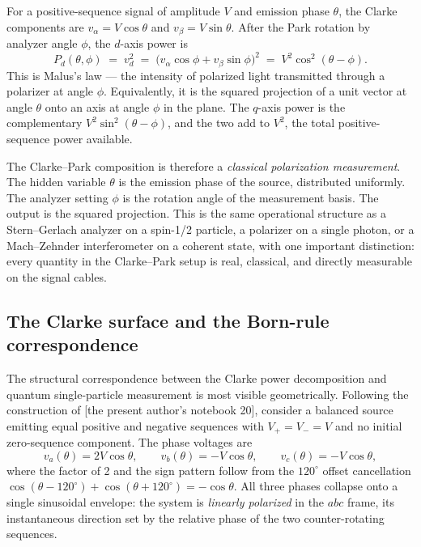 \documentclass[
  11pt]{article}
\begin{document}
For a positive-sequence signal of amplitude \(V\) and emission phase
\(\theta\), the Clarke components are \(v_\alpha = V\cos\theta\) and
\(v_\beta = V\sin\theta\). After the Park rotation by analyzer angle
\(\phi\), the \(d\)-axis power is \[
P_d(\theta, \phi) \;=\; v_d^2 \;=\; \big(v_\alpha\cos\phi + v_\beta\sin\phi\big)^2 \;=\; V^2\cos^2(\theta - \phi).
\] This is Malus's law --- the intensity of polarized light transmitted
through a polarizer at angle \(\phi\). Equivalently, it is the squared
projection of a unit vector at angle \(\theta\) onto an axis at angle
\(\phi\) in the plane. The \(q\)-axis power is the complementary
\(V^2\sin^2(\theta - \phi)\), and the two add to \(V^2\), the total
positive-sequence power available.

The Clarke--Park composition is therefore a \emph{classical polarization
measurement}. The hidden variable \(\theta\) is the emission phase of
the source, distributed uniformly. The analyzer setting \(\phi\) is the
rotation angle of the measurement basis. The output is the squared
projection. This is the same operational structure as a Stern--Gerlach
analyzer on a spin-1/2 particle, a polarizer on a single photon, or a
Mach--Zehnder interferometer on a coherent state, with one important
distinction: every quantity in the Clarke--Park setup is real,
classical, and directly measurable on the signal cables.

\subsection{The Clarke surface and the Born-rule
correspondence}\label{the-clarke-surface-and-the-born-rule-correspondence}

The structural correspondence between the Clarke power decomposition and
quantum single-particle measurement is most visible geometrically.
Following the construction of {[}the present author's notebook 20{]},
consider a balanced source emitting equal positive and negative
sequences with \(V_+ = V_- = V\) and no initial zero-sequence component.
The phase voltages are \[
v_a(\theta) = 2V\cos\theta, \qquad v_b(\theta) = -V\cos\theta, \qquad v_c(\theta) = -V\cos\theta,
\] where the factor of 2 and the sign pattern follow from the
\(120^\circ\) offset cancellation
\(\cos(\theta - 120^\circ) + \cos(\theta + 120^\circ) = -\cos\theta\).
All three phases collapse onto a single sinusoidal envelope: the system
is \emph{linearly polarized} in the \(abc\) frame, its instantaneous
direction set by the relative phase of the two counter-rotating
sequences.
\end{document}
